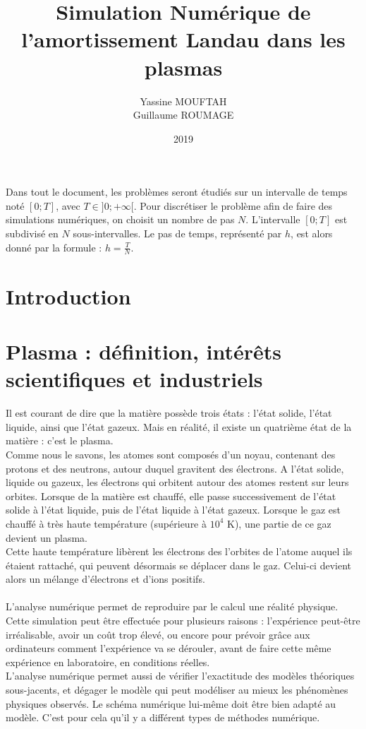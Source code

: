 \documentclass{article}
\title{Simulation Numérique de l'amortissement Landau dans les plasmas}
\date{2019}
\author{Yassine MOUFTAH\\Guillaume ROUMAGE}
\begin{document}
\maketitle
\newpage
\tableofcontents
\newpage
\noindent Dans tout le document, les problèmes seront étudiés sur un intervalle de temps noté $[0;T]$, avec $T \in ]0; + \infty[$. Pour discrétiser le problème afin de faire des simulations numériques, on choisit un nombre de pas $N$. L'intervalle $[0;T]$ est subdivisé en $N$ sous-intervalles. Le pas de temps, représenté par $h$, est alors donné par la formule : $h = \frac{T}{N}$.
\newpage
\section{Introduction}
\section{Plasma : définition, intérêts scientifiques et industriels}
Il est courant de dire que la matière possède trois états : l'état solide, l'état liquide, ainsi que l'état gazeux. Mais en réalité, il existe un quatrième état de la matière : c'est le plasma.\\
Comme nous le savons, les atomes sont composés d'un noyau, contenant des protons et des neutrons, autour duquel gravitent des électrons. A l'état solide, liquide ou gazeux, les électrons qui orbitent autour des atomes restent sur leurs orbites. Lorsque de la matière est chauffé, elle passe successivement de l'état solide à l'état liquide, puis de l'état liquide à l'état gazeux. Lorsque le gaz est chauffé à très haute température (supérieure à $10^4$ K), une partie de ce gaz devient un plasma.\\
Cette haute température libèrent les électrons des l'orbites de l'atome auquel ils étaient rattaché, qui peuvent désormais se déplacer dans le gaz. Celui-ci devient alors un mélange d'électrons et d'ions positifs.\\
\\
L'analyse numérique permet de reproduire par le calcul une réalité physique. Cette simulation peut être effectuée pour plusieurs raisons : l'expérience peut-être irréalisable, avoir un coût trop élevé, ou encore pour prévoir grâce aux ordinateurs comment l'expérience va se dérouler, avant de faire cette même expérience en laboratoire, en conditions réelles.\\
L'analyse numérique permet aussi de vérifier l'exactitude des modèles théoriques sous-jacents, et dégager le modèle qui peut modéliser au mieux les phénomènes physiques observés. Le schéma numérique lui-même doit être bien adapté au modèle. C'est pour cela qu'il y a différent types de méthodes numérique.
\end{document}
